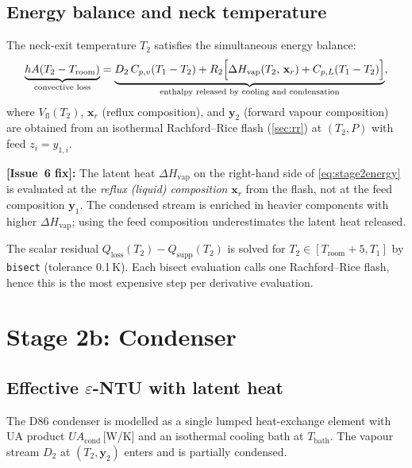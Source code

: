 \documentclass[11pt,letterpaper]{article}
\begin{document}
\subsection{Energy balance and neck temperature}

The neck-exit temperature $T_2$ satisfies the simultaneous energy balance:
\begin{equation}
  \underbrace{h A (T_2 - T_{\mathrm{room}})}_{\text{convective loss}}
  = \underbrace{D_2\, C_{p,v}(T_1 - T_2)
    + R_2\Bigl[\Delta H_{\mathrm{vap}}(T_2,\,\mathbf{x}_r) + C_{p,L}(T_1 - T_2)\Bigr]}_{\text{enthalpy released by cooling and condensation}},
  \label{eq:stage2energy}
\end{equation}
where $V_{\mathrm{fl}}(T_2)$, $\mathbf{x}_r$ (reflux composition), and $\mathbf{y}_2$
(forward vapour composition) are obtained from an isothermal Rachford--Rice
flash (\cref{sec:rr}) at $(T_2, P)$ with feed $z_i = y_{1,i}$.

\textbf{[Issue~6 fix]:} The latent heat $\Delta H_{\mathrm{vap}}$ on the
right-hand side of \cref{eq:stage2energy} is evaluated at the \emph{reflux
(liquid) composition} $\mathbf{x}_r$ from the flash, not at the feed
composition $\mathbf{y}_{1}$.  The condensed stream is enriched in heavier
components with higher $\Delta H_{\mathrm{vap}}$; using the feed composition
underestimates the latent heat released.

The scalar residual $Q_{\mathrm{loss}}(T_2) - Q_{\mathrm{supp}}(T_2)$ is
solved for $T_2 \in [T_{\mathrm{room}}+5, T_1]$ by \texttt{bisect}
(tolerance 0.1\,K).  Each bisect evaluation calls one Rachford--Rice flash,
hence this is the most expensive step per derivative evaluation.

\section{Stage 2b: Condenser}
\label{sec:condenser}

\subsection{Effective \texorpdfstring{$\varepsilon$}{e}-NTU with latent heat}

The D86 condenser is modelled as a single lumped heat-exchange element with
UA product $UA_{\mathrm{cond}}$\,[W/K] and an isothermal cooling bath at
$T_{\mathrm{bath}}$.  The vapour stream $D_2$ at $(T_2, \mathbf{y}_2)$ enters
and is partially condensed.
\end{document}
